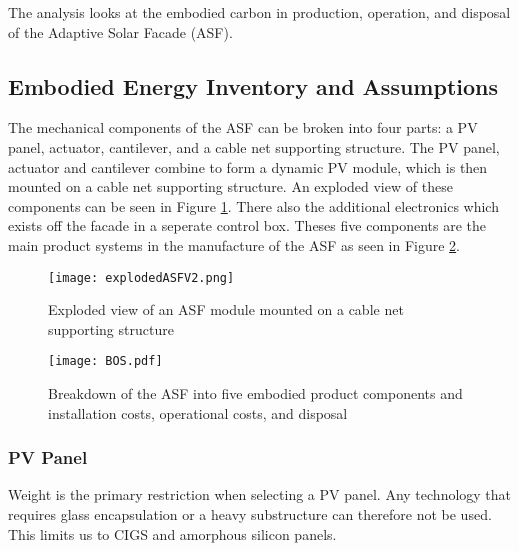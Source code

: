 
The analysis looks at the embodied carbon in production, operation, and disposal of the Adaptive Solar Facade (ASF).

\subsection{Embodied Energy Inventory and Assumptions}

The mechanical components of the ASF can be broken into four parts: a PV panel, actuator, cantilever, and a cable net supporting structure. The PV panel, actuator and cantilever combine to form a dynamic PV module, which is then mounted on a cable net supporting structure. An exploded view of these components can be seen in Figure \ref{fig:explodedView}. There also the additional electronics which exists off the facade in a seperate control box. Theses five components are the main product systems in the manufacture of the ASF as seen in Figure \ref{fig:BOS}.



\begin{figure}[H]
\begin{center}
\texttt{[image: explodedASFV2.png]}
\caption{Exploded view of an ASF module mounted on a cable net supporting structure}
\label{fig:explodedView}
\end{center}
\end{figure}

\begin{figure}[ht]
\begin{center}
\texttt{[image: BOS.pdf]}
\caption{Breakdown of the ASF into five embodied product components and installation costs, operational costs, and disposal}
\label{fig:BOS}
\end{center}
\end{figure}

\subsubsection*{PV Panel}
Weight is the primary restriction when selecting a PV panel. Any technology that requires glass encapsulation or a heavy substructure can therefore not be used. This limits us to CIGS and amorphous silicon panels.\\

